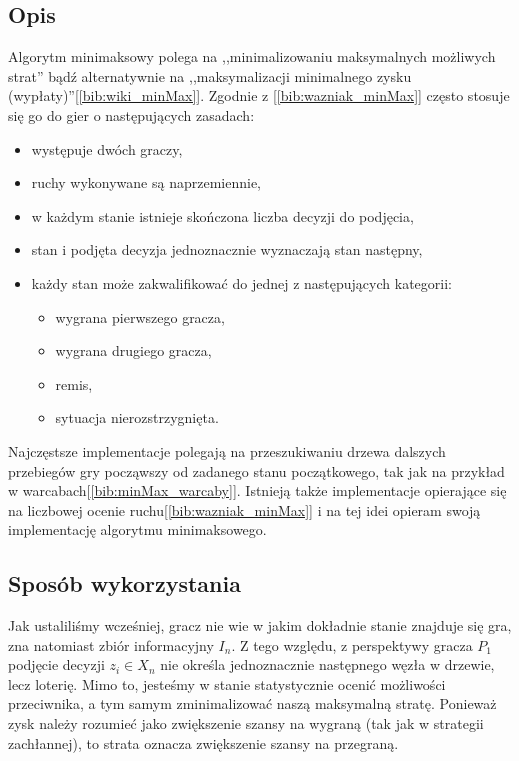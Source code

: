 \subsection{Opis}
Algorytm minimaksowy polega na ,,minimalizowaniu maksymalnych możliwych strat'' bądź alternatywnie na ,,maksymalizacji minimalnego zysku (wypłaty)''[\ref{bib:wiki_minMax}]. Zgodnie z [\ref{bib:wazniak_minMax}] często stosuje się go do gier o następujących zasadach:
\begin{itemize}
	\item występuje dwóch graczy,
	\item ruchy wykonywane są naprzemiennie,
	\item w każdym stanie istnieje skończona liczba decyzji do podjęcia,
	\item stan i podjęta decyzja jednoznacznie wyznaczają stan następny,
	\item każdy stan może zakwalifikować do jednej z następujących kategorii:
	\begin{itemize}
		\item wygrana pierwszego gracza,
		\item wygrana drugiego gracza,
		\item remis,
		\item sytuacja nierozstrzygnięta.
	\end{itemize}
\end{itemize}
Najczęstsze implementacje polegają na przeszukiwaniu drzewa dalszych przebiegów gry począwszy od zadanego stanu początkowego, tak jak na przykład w warcabach[\ref{bib:minMax_warcaby}]. Istnieją także implementacje opierające się na liczbowej ocenie ruchu[\ref{bib:wazniak_minMax}] i na tej idei opieram swoją implementację algorytmu minimaksowego.

\subsection{Sposób wykorzystania}
Jak ustaliliśmy wcześniej, gracz nie wie w jakim dokładnie stanie znajduje się gra, zna natomiast zbiór informacyjny $I_n$. Z tego względu, z perspektywy gracza $P_1$ podjęcie decyzji $z_i \in X_n$ nie określa jednoznacznie następnego węzła w drzewie, lecz loterię. Mimo to, jesteśmy w stanie statystycznie ocenić możliwości przeciwnika, a tym samym zminimalizować naszą maksymalną stratę. Ponieważ zysk należy rozumieć jako zwiększenie szansy na wygraną (tak jak w strategii zachłannej), to strata oznacza zwiększenie szansy na przegraną. 

